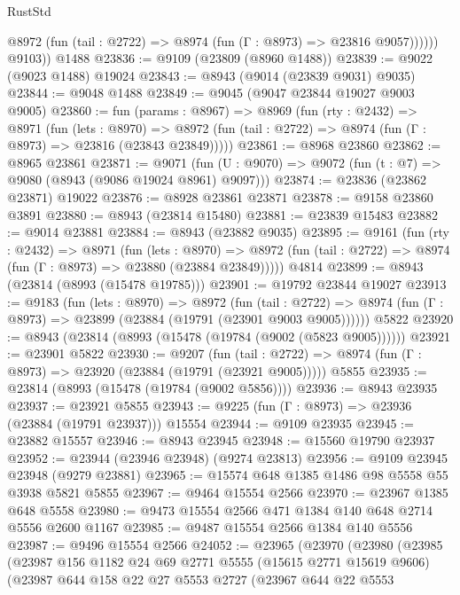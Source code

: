 \begin{lexlean}{RustStd}
\begin{coremodule}
              @8972 (fun (tail : @2722) => @8974 (fun (Γ : @8973) => @23816 @9057))))))
        @9103))
    @1488
@23836 := @9109 (@23809 (@8960 @1488))
@23839 := @9022 (@9023 @1488) @19024
@23843 := @8943 (@9014 (@23839 @9031) @9035)
@23844 := @9048 @1488
@23849 := @9045 (@9047 @23844 @19027 @9003 @9005)
@23860 := fun (params : @8967) =>
  @8969
    (fun (rty : @2432) =>
    @8971
      (fun (lets : @8970) =>
      @8972 (fun (tail : @2722) => @8974 (fun (Γ : @8973) => @23816 (@23843 @23849)))))
@23861 := @8968 @23860
@23862 := @8965 @23861
@23871 := @9071
    (fun (U : @9070) => @9072 (fun (t : @7) => @9080 (@8943 (@9086 @19024 @8961) @9097)))
@23874 := @23836 (@23862 @23871) @19022
@23876 := @8928 @23861 @23871
@23878 := @9158 @23860 @3891
@23880 := @8943 (@23814 @15480)
@23881 := @23839 @15483
@23882 := @9014 @23881
@23884 := @8943 (@23882 @9035)
@23895 := @9161
    (fun (rty : @2432) =>
    @8971
      (fun (lets : @8970) =>
      @8972 (fun (tail : @2722) => @8974 (fun (Γ : @8973) => @23880 (@23884 @23849)))))
    @4814
@23899 := @8943 (@23814 (@8993 (@15478 @19785)))
@23901 := @19792 @23844 @19027
@23913 := @9183
    (fun (lets : @8970) =>
    @8972
      (fun (tail : @2722) =>
      @8974 (fun (Γ : @8973) => @23899 (@23884 (@19791 (@23901 @9003 @9005))))))
    @5822
@23920 := @8943 (@23814 (@8993 (@15478 (@19784 (@9002 (@5823 @9005))))))
@23921 := @23901 @5822
@23930 := @9207
    (fun (tail : @2722) => @8974 (fun (Γ : @8973) => @23920 (@23884 (@19791 (@23921 @9005)))))
    @5855
@23935 := @23814 (@8993 (@15478 (@19784 (@9002 @5856))))
@23936 := @8943 @23935
@23937 := @23921 @5855
@23943 := @9225 (fun (Γ : @8973) => @23936 (@23884 (@19791 @23937))) @15554
@23944 := @9109 @23935
@23945 := @23882 @15557
@23946 := @8943 @23945
@23948 := @15560 @19790 @23937
@23952 := @23944 (@23946 @23948) (@9274 @23813)
@23956 := @9109 @23945 @23948 (@9279 @23881)
@23965 := @15574 @648 @1385 @1486 @98 @5558 @55 @3938 @5821 @5855
@23967 := @9464 @15554 @2566
@23970 := @23967 @1385 @648 @5558
@23980 := @9473 @15554 @2566 @471 @1384 @140 @648 @2714 @5556 @2600 @1167
@23985 := @9487 @15554 @2566 @1384 @140 @5556
@23987 := @9496 @15554 @2566
@24052 := @23965
    (@23970
      (@23980
        (@23985
          (@23987
            @156
            @1182
            @24
            @69
            @2771
            @5555
            (@15615 @2771 @15619 @9606)
            (@23987
              @644
              @158
              @22
              @27
              @5553
              @2727
              (@23967
                @644
                @22
                @5553

\end{coremodule}
\end{lexlean}
